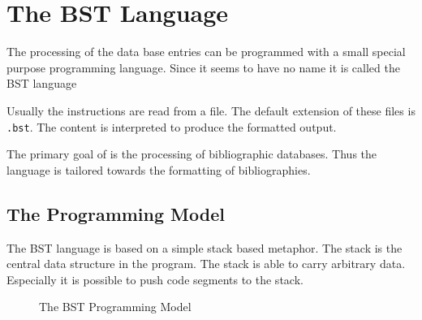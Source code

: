 
\chapter{The BST Language}%

%
The processing of the data base entries can be programmed with a small
special purpose programming language. Since it seems to have no name
it is called the BST language

Usually the instructions are read from a file. The default extension
of these files is \texttt{.bst}. The content is interpreted to produce
the formatted output.

The primary goal of \BibTeX{} is the processing of
bibliographic databases. Thus the language is tailored towards the
formatting of bibliographies.


\def\cmdIndex#1{\index{#1@\texttt{#1}}}%
\def\fctIndex#1{\index{#1@\texttt{#1}}%
  \index{function!#1@\texttt{#1}}}%
\def\varIndex#1{\index{#1@\texttt{#1}}%
  \index{variable!#1@\texttt{#1}}}%

\section{The Programming Model}

The BST language is based on a simple stack based metaphor. The stack
is the central data structure in the program. The stack is able to
carry arbitrary data. Especially it is possible to push code segments
to the stack.

\begin{figure}[tb]
  \centering
  
  \caption{The BST Programming Model}
  \label{fig:bst-model}
\end{figure}


